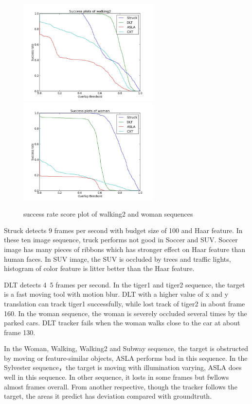 \documentclass{article}
\begin{document}
\begin{figure}[hbt]
  \includegraphics[width=200pt]{walking2.jpg}
  \includegraphics[width=200pt]{woman.jpg}
  \label{fig:woman}
  \caption{success rate score plot of walking2 and woman sequences}
\end{figure}

Struck detects 9 frames per second with budget size of 100 and Haar feature. In these ten image sequence, truck performs not good in Soccer and SUV. Soccer image has many pieces of ribbons which has stronger effect on Haar feature than human faces. In SUV image, the SUV is occluded by trees and traffic lights, histogram of color feature is litter better than the Haar feature.

DLT detects 4~5 frames per second. In the tiger1 and tiger2 sequence, the target is a fast moving tool with motion blur. DLT with a higher value of x and y translation can track tiger1 successfully, while lost track of tiger2 in about frame 160. In the woman sequence, the woman is severely occluded several times by the parked cars. DLT tracker fails when the woman walks close to the car at about frame 130.

In the Woman, Walking, Walking2 and Subway sequence, the target is obstructed by moving or feature-similar objects, ASLA performs bad in this sequence. In the Sylvester sequence，the target is moving with illumination varying, ASLA does well in this sequence. In other sequence, it losts in some frames but fwllows almost frames overall. From another respective,  though the tracker follows the target, the areas it predict has deviation compared with  groundtruth.
\end{document}
